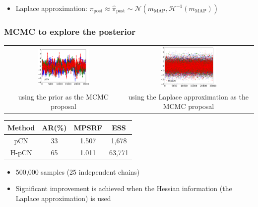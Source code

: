 \documentclass{beamer}
\begin{document}
\begin{frame}[c]
  \vspace{0.1cm}

  \begin{itemize}
    \item Laplace approximation: $\pi_{\text{post}} \approx
      \hat{\pi}_{\text{post}} \sim \mathcal{N} (m_{\text{MAP}},
      \mathcal{H}^{-1} (m_{\text{MAP}}))$
  \end{itemize}
\end{frame}

\begin{frame}[c]
  \frametitle{MCMC to explore the posterior}

  \begin{tabulary}{\linewidth}{CC}
    \includegraphics[width=0.45\textwidth]{./figures/ex1_LargeNoise_trace_pcn.png}
    &
    \includegraphics[width=0.45\textwidth]{./figures/ex1_LargeNoise_trace_hpcn.png}
    \\
    {\tiny using the prior as the MCMC proposal}
    &
    {\tiny using the Laplace approximation as the MCMC proposal}
  \end{tabulary}

  \begin{center}
    \begin{tabular}{cccc}
      Method & AR(\%) & MPSRF & ESS
      \\
      \hline
      pCN & 33 & 1.507 & 1,678
      \\
      H-pCN & 65 & 1.011 & 63,771
    \end{tabular}
  \end{center}

  \begin{itemize}
    \item 500,000 samples (25 independent chains)
    \item Significant improvement is achieved when the Hessian information (the
      Laplace approximation) is
      used
  \end{itemize}
\end{frame}
\end{document}
